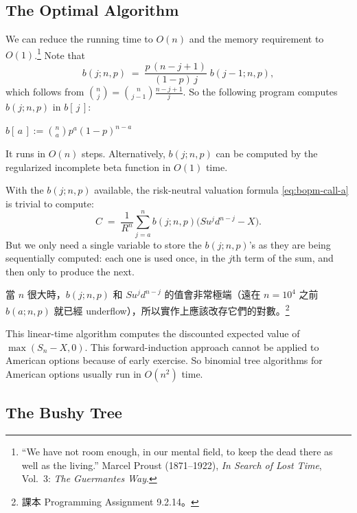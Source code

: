 \subsection{The Optimal Algorithm}


We can reduce the running time to $O(n)$ and the memory requirement to $O(1)$.\footnote{``We have not room enough, in our mental field, to keep the dead there as well as the living.'' Marcel Proust (1871--1922), \emph{In Search of Lost Time}, Vol.~3: \emph{The Guermantes Way}.}
Note that
\[
	b(j;n,p) \;=\; \frac{p\,(n-j+1)}{(1-p)\,j}\;b(j-1;n,p) ,
\]
\suppstart
which follows from $\binom{n}{j}=\binom{n}{j-1}\frac{n-j+1}{j}$.
\suppend
So the following program computes $b(j;n,p)$ in $b[\,j\,]$:

\begin{algorithm}[H]
	\caption{Computing $b(j;n,p)$ for $j=a,a+1,\ldots,n$}
	\label{alg:bopm-optimal}
	$b[\,a\,]:=\binom{n}{a}p^{a}(1-p)^{n-a}$\;
\end{algorithm}

It runs in $O(n)$ steps.
Alternatively, $b(j;n,p)$ can be computed by the regularized incomplete beta function in $O(1)$ time.

With the $b(j;n,p)$ available, the risk-neutral valuation formula \eqref{eq:bopm-call-a} is trivial to compute:
\[
	C \;=\; \frac{1}{R^{n}}\sum_{j=a}^{n}b(j;n,p)\bigl(Su^{j}d^{n-j}-X\bigr) .
\]
But we only need a single variable to store the $b(j;n,p)$'s as they are being sequentially computed: each one is used once, in the $j$th term of the sum, and then only to produce the next.

\suppstart
\begin{note}
	當 $n$ 很大時，$b(j;n,p)$ 和 $Su^{j}d^{n-j}$ 的值會非常極端（遠在 $n=10^{4}$ 之前 $b(a;n,p)$ 就已經 underflow），所以實作上應該改存它們的對數。\footnote{課本 Programming Assignment 9.2.14。}
\end{note}
\suppend

This linear-time algorithm computes the discounted expected value of $\max(S_{n}-X,0)$.
This forward-induction approach cannot be applied to American options because of early exercise.
So binomial tree algorithms for American options usually run in $O(n^{2})$ time.

\subsection{The Bushy Tree}

